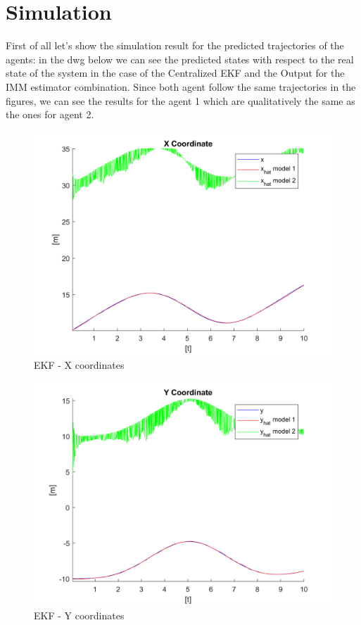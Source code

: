 \documentclass[conference]{IEEEtran}
\begin{document}
\section{Simulation}

First of all let's show the simulation result for the predicted trajectories of the agents: in the dwg below we can see the predicted states with respect to the real state of the system in the case of the Centralized EKF and the Output for the IMM estimator combination. Since both agent follow the same trajectories in the figures, we can see the results for the agent 1 which are qualitatively the same as the ones for agent 2.


\begin{figure}[H]
 \includegraphics[width=\linewidth]{dwg/x-coord.png}
  \caption{EKF - X coordinates}
 \label{fig:first}
\end{figure}
\bigskip \bigskip \bigskip \bigskip \bigskip \bigskip \bigskip \bigskip \bigskip \bigskip 
\begin{figure}[H]
 \includegraphics[width=\linewidth]{dwg/y-coord.png}
  \caption{EKF - Y coordinates}
 
\end{figure}
\end{document}
